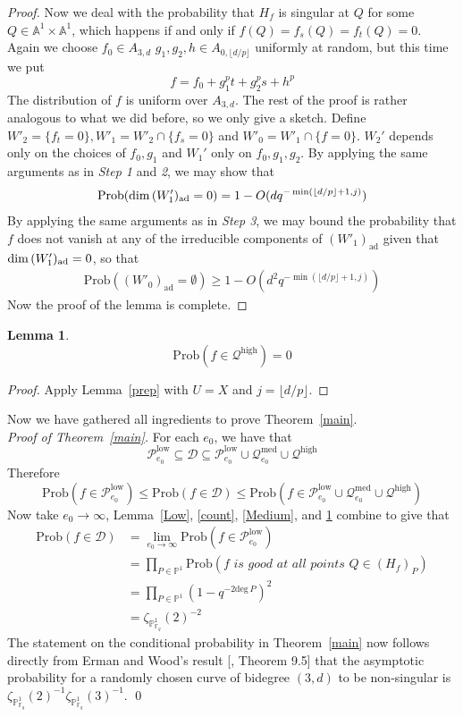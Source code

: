 \documentclass[12pt]{article}
\theoremstyle{plain}
\newtheorem{lemma}[equation]{Lemma}
\theoremstyle{definition}
\newcommand{\IA}{\mathbb{A}}
\newcommand{\IF}{\mathbb{F}}
\newcommand{\IP}{\mathbb{P}}
\newcommand{\sD}{\mathcal{D}}
\newcommand{\sP}{\mathcal{P}}
\newcommand{\sQ}{\mathcal{Q}}
\renewcommand{\deg}{\mathrm{deg}\,}
\renewcommand\dim{{\rm dim\,}}
\newcommand{\<}{\langle}
\renewcommand{\>}{\rangle}
\newcommand{\Prob}{\mathrm{Prob}}
\newcommand{\ad}{\mathrm{ad}}
\begin{document}
\begin{proof}
Now we deal with the probability that $H_f$ is singular at $Q$ for some $Q \in \IA^1 \times \IA^1$, which happens if and only if $f(Q) = f_s(Q) = f_t(Q) = 0$. Again we choose $f_0 \in A_{3, d}$  $g_1, g_2, h \in A_{0, \lfloor d/p \rfloor}$ uniformly at random, but this time we put
$$ f = f_0 + g_1^p t + g_2^p s + h^p $$
The distribution of $f$ is uniform over $A_{3, d}$. The rest of the proof is rather analogous to what we did before, so we only give a sketch. Define $W'_2 = \{f_{t} = 0 \}, W'_1 = W'_2 \cap \{ f_s = 0 \}$ and $W'_0 = W'_1 \cap \{ f = 0 \}$. $W_2'$ depends only on the choices of $f_0, g_1$ and $W_1'$ only on $f_0, g_1, g_2$. By applying the same arguments as in \textit{Step 1} and \textit{2}, we may show that 
\begin{align*} \Prob(\dim (W'_1)_{\ad} = 0) = 1 - O(d q^{- \min(\lfloor d/p \rfloor + 1, j)}) \end{align*}
By applying the same arguments as in \textit{Step 3}, we may bound the probability that $f$ does not vanish at any of the irreducible components of $(W'_1)_{\ad}$ given that $\dim (W'_1)_{\ad} = 0$, so that 
\begin{align*}
\Prob((W'_0)_{\ad} = \emptyset) \ge 1 - O(d^2 q^{- \min(\lfloor d/p \rfloor + 1, j)}) 
\end{align*}
Now the proof of the lemma is complete.
\end{proof}


\begin{lemma}
\label{High}
$$\Prob( f \in  \sQ^{\mathrm{high}}) = 0 $$
\end{lemma}
\begin{proof}
Apply Lemma~\ref{prep} with $U = X$ and $j = \lfloor d/p \rfloor$. 
\end{proof}
Now we have gathered all ingredients to prove Theorem~\ref{main}. \\
\noindent \textit{Proof of Theorem~\ref{main}.} 
For each $e_0$, we have that 
$$  \sP_{e_0}^{\mathrm{low}} \subseteq \sD \subseteq \sP_{e_0}^{\mathrm{low}} \cup \sQ_{e_0}^{\mathrm{med}} \cup \sQ^{\mathrm{high}}$$
Therefore 
$$ \Prob(f \in \sP_{e_0}^{\mathrm{low}}) \le \Prob(f \in \sD) \le \Prob(f \in \sP_{e_0}^{\mathrm{low}} \cup \sQ_{e_0}^{\mathrm{med}} \cup \sQ^{\mathrm{high}})$$
Now take $e_0 \to \infty$, Lemma~\ref{Low}, \ref{count}, \ref{Medium}, and \ref{High} combine to give that 
\begin{align*}
\Prob(f \in \sD) &= \lim_{e_0 \to \infty} \Prob(f \in \sP_{e_0}^{\mathrm{low}}) \\
&= \prod_{P \in \IP^1} \Prob( f \textit{ is good at all points } Q \in (H_f)_P ) \\
&= \prod_{P \in \IP^1} (1 - q^{-2 \deg P})^{2} \\
&= \zeta_{\IP^1_{\IF_q}}(2)^{-2}
\end{align*}
The statement on the conditional probability in Theorem~\ref{main} now follows directly from Erman and Wood's result [\cite{Wood}, Theorem 9.5] that the asymptotic probability for a randomly chosen curve of bidegree $(3, d)$ to be non-singular is $\zeta_{\IP^1_{\IF_q}}(2)^{-1}\zeta_{\IP^1_{\IF_q}}(3)^{-1}$. \qed
\end{document}
